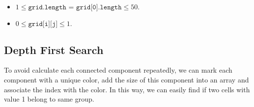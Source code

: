 \begin{itemize}
\item $1 \leq \texttt{grid.length = grid[0].length} \leq 50$.
\item $0 \leq \texttt{grid[i][j]} \leq 1$.
\end{itemize}

\subsection{Depth First Search}
To avoid calculate each connected component repeatedly, we can mark each component with a unique color, add the size of this component into an array and associate the index with the color. In this way, we can easily find if two cells with value 1 belong to same group.

\setcounter{lstlisting}{0}
